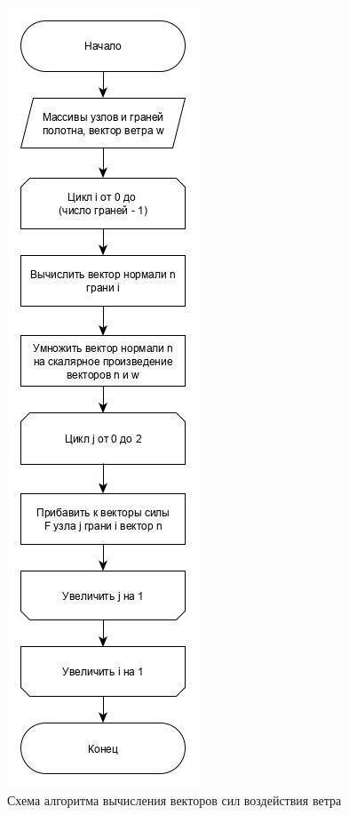 \begin{figure}[ht!]
\begin{center}
\begin{minipage}[h]{0.4\linewidth}
			\includegraphics[scale=0.65]{pos_wind.jpg}
			\caption{Схема алгоритма вычисления векторов сил воздействия ветра}
			\label{fig:pos_wind}
		\end{minipage}
	\end{center}
\end{figure}

